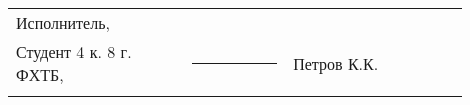 \begin{titlepage}

\end{titlepage}


\Executors %
\begin{longtable}{p{0.35\linewidth}p{0.2\linewidth}p{0.35\linewidth}}
    Исполнитель, 	&		&	\\
    Студент 4 к. 8 г. ФХТБ,	&\rule{1\linewidth}{0.1pt}	& Петров К.К. \\ \vspace{1cm}
\end{longtable}

